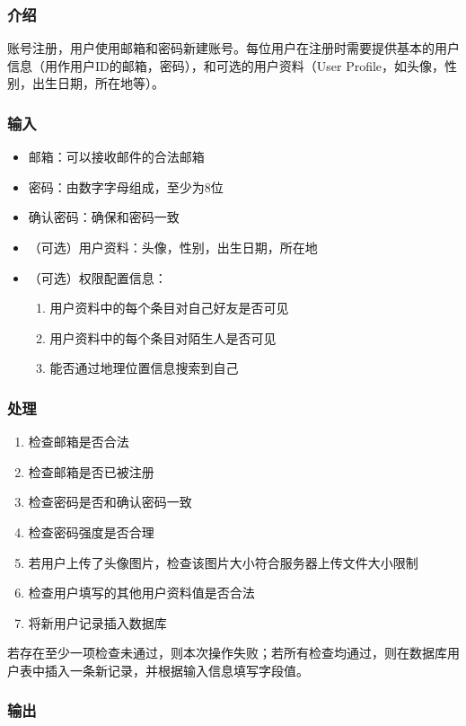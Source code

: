 \subsubsection{介绍}

账号注册，用户使用邮箱和密码新建账号。每位用户在注册时需要提供基本的用户信息（用作用户ID的邮箱，密码），和可选的用户资料（User Profile，如头像，性别，出生日期，所在地等）。

\subsubsection{输入}

\begin{itemize}
	\item 邮箱：可以接收邮件的合法邮箱
	\item 密码：由数字字母组成，至少为8位
	\item 确认密码：确保和密码一致
	\item （可选）用户资料：头像，性别，出生日期，所在地
	\item （可选）权限配置信息：
		\begin{enumerate}	
		\item 用户资料中的每个条目对自己好友是否可见
		\item 用户资料中的每个条目对陌生人是否可见
		\item 能否通过地理位置信息搜索到自己
		\end{enumerate}
	\end{itemize}
\subsubsection{处理}

\begin{enumerate}
	\item 检查邮箱是否合法
	\item 检查邮箱是否已被注册
	\item 检查密码是否和确认密码一致
	\item 检查密码强度是否合理
	\item 若用户上传了头像图片，检查该图片大小符合服务器上传文件大小限制
	\item 检查用户填写的其他用户资料值是否合法
	\item 将新用户记录插入数据库
	\end{enumerate}
若存在至少一项检查未通过，则本次操作失败；若所有检查均通过，则在数据库用户表中插入一条新记录，并根据输入信息填写字段值。

\subsubsection{输出}

